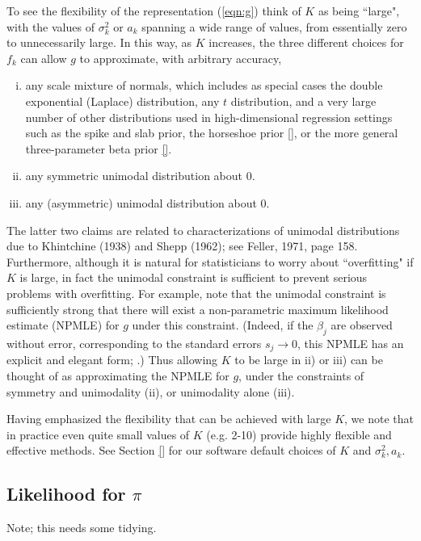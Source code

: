 \documentclass[11pt]{article}
\begin{document}
To see the flexibility of the representation (\ref{eqn:g})
think of $K$ as being ``large", with the values of $\sigma^2_k$ or $a_k$ 
spanning a wide range of values, from
essentially zero to unnecessarily large. In this way, as $K$ increases, the three different choices for $f_k$ can allow $g$ to approximate,
with arbitrary accuracy,
\begin{enumerate}[i)]
\item any scale mixture of normals, which includes as special cases
the double exponential (Laplace) distribution, any $t$ distribution, and a very large number of other distributions used in 
high-dimensional regression settings such as the spike and slab prior, the horseshoe prior \ref{}, or the more general three-parameter beta prior \ref{}.
\item any symmetric unimodal distribution about 0.
\item any (asymmetric) unimodal distribution about 0.
\end{enumerate}
The latter two claims are related to characterizations of unimodal distributions due to Khintchine (1938) and  Shepp (1962); see Feller, 1971, page  158. 
Furthermore, although it is natural for statisticians to worry about ``overfitting" if $K$ is large, 
in fact the unimodal constraint is sufficient to prevent serious problems with overfitting. For example, note that the unimodal
constraint is sufficiently strong that there will exist a non-parametric
maximum likelihood estimate (NPMLE) for $g$ under this constraint. (Indeed, if the $\beta_j$ are observed without error, corresponding to the standard errors $s_j \rightarrow 0$, this NPMLE has an explicit and elegant form; \cite{grenander}.)
Thus allowing $K$ to be large in ii) or iii) can be thought of as approximating the NPMLE for $g$, under the constraints of symmetry and unimodality (ii), or unimodality alone (iii). 

Having emphasized the flexibility that can be achieved with large $K$, we note that in practice even quite small values of $K$ (e.g. 2-10) provide highly flexible
and effective methods. See Section \ref{} for our software default choices of $K$ and $\sigma^2_k,a_k$.


\subsection*{Likelihood for $\pi$}

Note; this needs some tidying.
\end{document}
